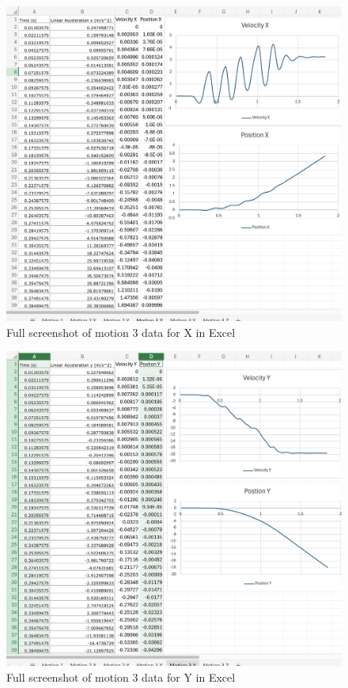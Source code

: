 \documentclass[idxtotoc,hyperref,openany]{labbook} %
\begin{document}
\begin{figure}[H] %
\begin{center}
\includegraphics[width=1.3\linewidth]{images/Lab.03/Lab03Motion3XExcel.png}
\end{center}
\caption{Full screenshot of motion 3 data for X in Excel}
\label{fig:Lab03-Motion3-X-Excel}
\end{figure}

\begin{figure}[H] %
\begin{center}
\includegraphics[width=1.2\linewidth]{images/Lab.03/Lab03Motion3YExcel.png}
\end{center}
\caption{Full screenshot of motion 3 data for Y in Excel}
\label{fig:Lab03-Motion3-Y-Excel}
\end{figure}
\end{document}

